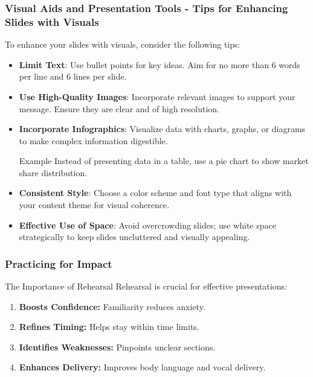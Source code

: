 \documentclass[aspectratio=169]{beamer}
\begin{document}
\begin{frame}[fragile]
    \frametitle{Visual Aids and Presentation Tools - Tips for Enhancing Slides with Visuals}
    To enhance your slides with visuals, consider the following tips:
    \begin{itemize}
        \item \textbf{Limit Text}: Use bullet points for key ideas. Aim for no more than 6 words per line and 6 lines per slide.
        \item \textbf{Use High-Quality Images}: Incorporate relevant images to support your message. Ensure they are clear and of high resolution.
        \item \textbf{Incorporate Infographics}: Visualize data with charts, graphs, or diagrams to make complex information digestible.
            \begin{block}{Example}
                Instead of presenting data in a table, use a pie chart to show market share distribution.
            \end{block}
        \item \textbf{Consistent Style}: Choose a color scheme and font type that aligns with your content theme for visual coherence.
        \item \textbf{Effective Use of Space}: Avoid overcrowding slides; use white space strategically to keep slides uncluttered and visually appealing.
    \end{itemize}
\end{frame}

\begin{frame}[fragile]
    \frametitle{Practicing for Impact}
    \begin{block}{The Importance of Rehearsal}
        Rehearsal is crucial for effective presentations:
        \begin{enumerate}
            \item \textbf{Boosts Confidence:} Familiarity reduces anxiety.
            \item \textbf{Refines Timing:} Helps stay within time limits.
            \item \textbf{Identifies Weaknesses:} Pinpoints unclear sections.
            \item \textbf{Enhances Delivery:} Improves body language and vocal delivery.
        \end{enumerate}
    \end{block}
\end{frame}
\end{document}
